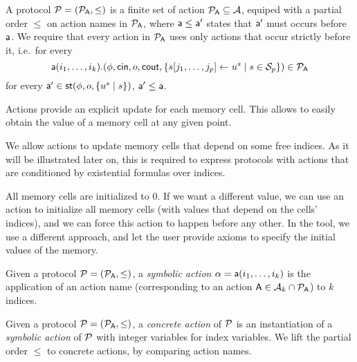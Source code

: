 \begin{definition} \label{def:proto}
  A protocol $\mathcal{P} = (\mathcal{P}_{\textsf{A}}, \leq)$ is a finite set of action $\mathcal{P}_{\textsf{A}} \subseteq \mathcal{A}$, equiped with a partial order $\leq$ on action names in $\mathcal{P}_{\textsf{A}}$, where $\textsf{a} \leq \textsf{a}'$ states that $\textsf{a}'$ must occurs before $\textsf{a}$. %
  We require that every action in $\mathcal{P}_{\textsf{A}}$ uses only actions that occur strictly before it, i.e.\ for every
  \[
     \textsf{a}(i_1,\dots,i_k).(\phi, \mathsf{cin}, o, \mathsf{cout},
     \{s[j_1,\dots, j_p] \leftarrow u^{s} \mid s \in \mathcal{S}_{p}\})
     \in \mathcal{P}_{\textsf{A}}
  \]
  for every $\textsf{a}' \in \mathsf{st}(\phi, o, \{u^{s}\mid s\})$, $\textsf{a}' \leq \textsf{a}$.
\end{definition}

\begin{remark}
  Actions provide an explicit update for each memory cell. This
  allows to easily obtain the value of a memory cell at any given point.

  We allow actions to update memory cells that depend on some free indices.  As
  it will be illustrated later on, this is required to express protocols with
  actions that are conditioned by existential formulas over indices.

  All memory cells are initialized to $0$. If we want a different value, we can use an action to initialize all memory cells (with values that depend on the cells'
  indices), and we can force this action to happen before any other.
  In the tool, we use a different approach, and let the user provide axioms to specify the initial values of the memory.
\end{remark}

\begin{definition}
  Given a protocol $\mathcal{P} = (\mathcal{P}_{\textsf{A}}, \leq)$, a \emph{symbolic action} $\alpha = \textsf{a}(i_1,\ldots,i_k)$ is the application of an action name (corresponding to an action $\textsf{A} \in \mathcal{A}_k \cap \mathcal{P}_{\textsf{A}}$) to $k$ indices.
\end{definition}

\begin{definition}
  Given a protocol $\mathcal{P} = (\mathcal{P}_{\textsf{A}}, \leq)$, a \emph{concrete action} of $\mathcal{P}$ is an instantiation of a \emph{symbolic action} of $\mathcal{P}$ with integer variables for index variables. We lift the partial order $\leq$ to concrete actions, by comparing action names.
\end{definition}

